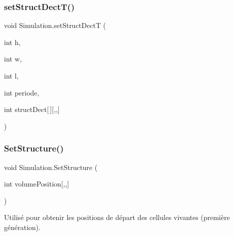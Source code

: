 \subsubsection{\texorpdfstring{set\+Struct\+Dect\+T()}{setStructDectT()}}
{\footnotesize\ttfamily void Simulation.\+set\+Struct\+DectT (\begin{DoxyParamCaption}\item[{int}]{h,  }\item[{int}]{w,  }\item[{int}]{l,  }\item[{int}]{periode,  }\item[{int}]{struct\+Dect\mbox{[}$\,$\mbox{]}\mbox{[},,\mbox{]} }\end{DoxyParamCaption})\hspace{0.3cm}{\ttfamily [inline]}}

\mbox{\label{class_simulation_a775498931843884fbc6c08de3b2b1afd}} 
\subsubsection{\texorpdfstring{Set\+Structure()}{SetStructure()}}
{\footnotesize\ttfamily void Simulation.\+Set\+Structure (\begin{DoxyParamCaption}\item[{int}]{volume\+Position\mbox{[},,\mbox{]} }\end{DoxyParamCaption})\hspace{0.3cm}{\ttfamily [inline]}}



Utilisé pour obtenir les positions de départ des cellules vivantes (première génération). 


